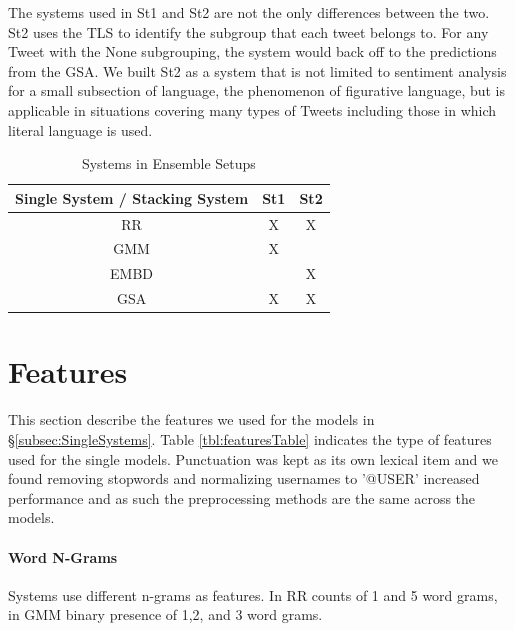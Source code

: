 \documentclass[11pt,letterpaper]{article}
\begin{document}
The systems used in {\sc St1} and {\sc St2} are not the only differences between the two. {\sc St2} uses the TLS to identify the subgroup that each tweet belongs to. For any Tweet with the {\sc None} subgrouping, the system would back off to the predictions from the GSA. We built {\sc St2} as a system that is not limited to sentiment analysis for a small subsection of language, the phenomenon of figurative language, but is applicable in situations covering many types of Tweets including those in which literal language is used.

\begin{table}[ht!]
\begin{center}
\begin{tabular}{c || c c}
Single System / Stacking System & {\sc St1} & {\sc St2}\\
\hline
{\sc RR} & X & X\\
{\sc GMM} & X & \\
{\sc EMBD} & &X\\
{\sc GSA} & X&X \\
\end{tabular}
\end{center}
\caption{Systems in Ensemble Setups}
\label{tbl:stackingTable}
\end{table}

\section{Features}
\label{sec:Features}

This section describe the features we used for the models in \S \ref{subsec:SingleSystems}. Table \ref{tbl:featuresTable} indicates the type of features used for the single models. Punctuation was kept as its own lexical item and we found removing stopwords and normalizing usernames to '@USER'  increased performance and as such the preprocessing methods are the same across the models. 

\paragraph{Word N-Grams}
Systems use different n-grams as features. In {\sc RR} counts of 1 and 5 word grams, in GMM binary presence of 1,2, and 3 word grams.
\end{document}
